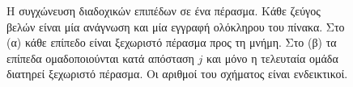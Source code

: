 \begin{figure}[H]
    \caption[Συγχώνευση διαδοχικών επιπέδων σε ένα πέρασμα]{Η συγχώνευση διαδοχικών επιπέδων σε ένα πέρασμα. Κάθε
    ζεύγος βελών είναι μία ανάγνωση και μία εγγραφή ολόκληρου του πίνακα. Στο (α)
    κάθε επίπεδο είναι ξεχωριστό πέρασμα προς τη μνήμη. Στο (β) τα επίπεδα
    ομαδοποιούνται κατά απόσταση $j$ και μόνο η τελευταία ομάδα διατηρεί ξεχωριστό
    πέρασμα. Οι αριθμοί του σχήματος είναι ενδεικτικοί.}
    \label{fig:cpu-layer-fusion}
\end{figure}
